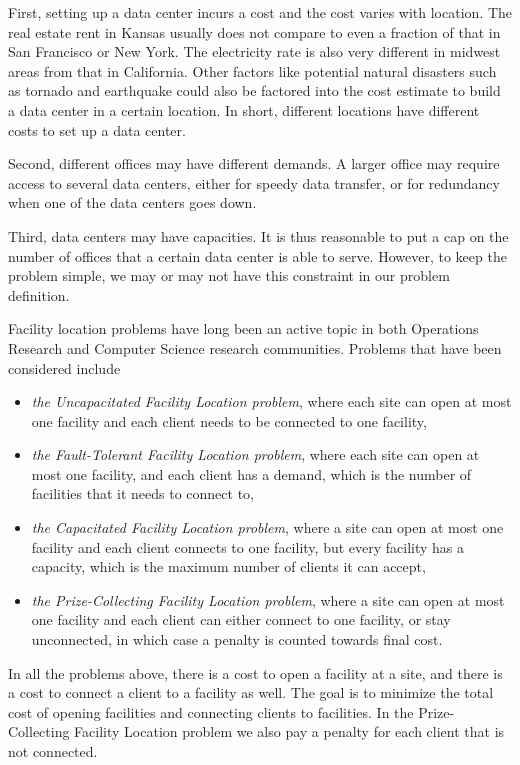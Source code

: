 \documentclass[oneside,final]{ucr}
\begin{document}
First, setting up a data center incurs a cost and the cost
varies with location. The real estate rent in Kansas usually
does not compare to even a fraction of that in San Francisco
or New York. The electricity rate is also very different in
midwest areas from that in California. Other factors like
potential natural disasters such as tornado and earthquake
could also be factored into the cost estimate to build a
data center in a certain location. In short, different
locations have different costs to set up a data center.

Second, different offices may have different demands. A
larger office may require access to several data centers,
either for speedy data transfer, or for redundancy when one
of the data centers goes down.

Third, data centers may have capacities. It is thus
reasonable to put a cap on the number of offices that a
certain data center is able to serve. However, to keep the
problem simple, we may or may not have this constraint in
our problem definition.

Facility location problems have long been an active topic in
both Operations Research and Computer Science research
communities. Problems that have been considered include
\begin{itemize}
\item \emph{the Uncapacitated Facility Location problem}, where
  each site can open at most one facility and each client
  needs to be connected to one facility,
\item \emph{the Fault-Tolerant Facility Location problem},
  where each site can open at most one facility, and each
  client has a demand, which is the number of facilities
  that it needs to connect to,
\item \emph{the Capacitated Facility Location problem},
  where a site can open at most one facility and each client
  connects to one facility, but every facility has a
  capacity, which is the maximum number of clients it can
  accept,
\item \emph{the Prize-Collecting Facility Location problem},
  where a site can open at most one facility and each client
  can either connect to one facility, or stay unconnected,
  in which case a penalty is counted towards final cost.
\end{itemize}
In all the problems above, there is a cost to open a
facility at a site, and there is a cost to connect a client
to a facility as well. The goal is to minimize the total
cost of opening facilities and connecting clients to
facilities. In the Prize-Collecting Facility Location
problem we also pay a penalty for each client that is not
connected.
\end{document}
